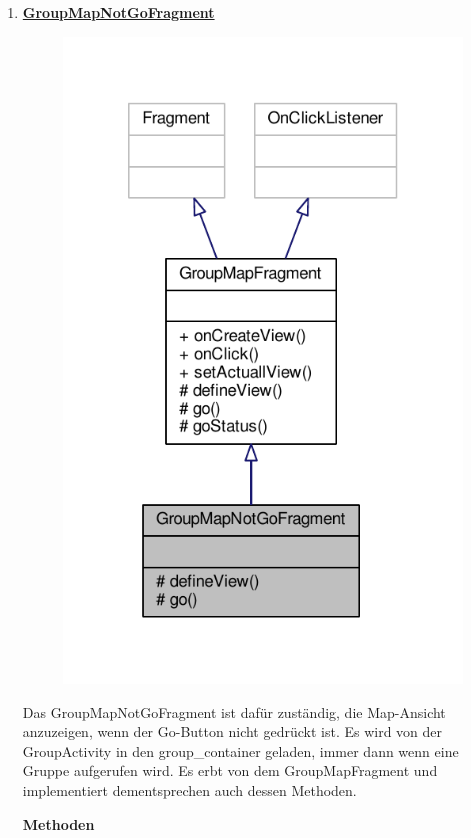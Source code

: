 \begin{enumerate}
	\item \textbf{\underline{GroupMapNotGoFragment}}
	\begin{figure}[H]
		\includegraphics[scale = 1]{res/group_map_not_go_fragment__inherit__graph.pdf}
		\centering
	\end{figure}
	Das GroupMapNotGoFragment ist dafür zuständig, die Map-Ansicht anzuzeigen, wenn der Go-Button nicht gedrückt ist. Es wird von der GroupActivity in den group\_container geladen, immer dann wenn eine Gruppe aufgerufen wird. Es erbt von dem GroupMapFragment und implementiert dementsprechen auch dessen Methoden.
	
	\textbf{Methoden}	
	\begin{enumerate}
		

\end{enumerate}
\end{enumerate}
